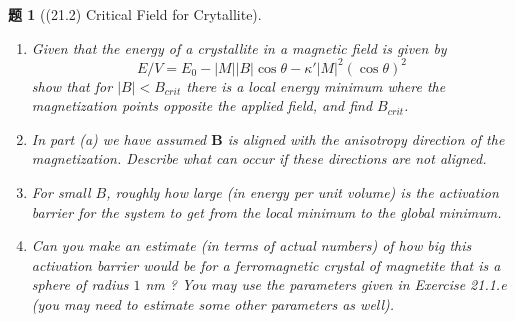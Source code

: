 \documentclass[UTF8,10pt,a4paper]{article}
\theoremstyle{Problem}
\newtheorem{prob}{题}
\theoremstyle{Solution}
\providecommand{\abs}[1]{\left\lvert#1\right\rvert}
\begin{document}
\begin{prob}[(21.2) Critical Field for Crytallite]
    \begin{enumerate}
        \item[(a)] Given that the energy of a crystallite in a magnetic field is given by
        \[
            E/V=E_0-\abs{M}\abs{B}\cos\theta-\kappa'\abs{M}^2(\cos\theta)^2
        \]
        show that for $\abs{B}<B_{crit}$ there is a local energy minimum where the magnetization points opposite the applied field, and find $B_{crit}$.
        \item[(b)$^*$] In part (a) we have assumed $\bm{B}$ is aligned with the anisotropy direction of the magnetization. Describe what can occur if these directions are not aligned.
        \item[(c)] For small $B$, roughly how large (in energy per unit volume) is the activation barrier for the system to get from the local minimum to the global minimum.
        \item[(d)] Can you make an estimate (in terms of actual numbers) of how big this activation barrier would be for a ferromagnetic crystal of magnetite that is a sphere of radius $1$ nm ? You may use the parameters given in Exercise 21.1.e (you may need to estimate some other parameters as well).
    \end{enumerate}
\end{prob}
\end{document}
